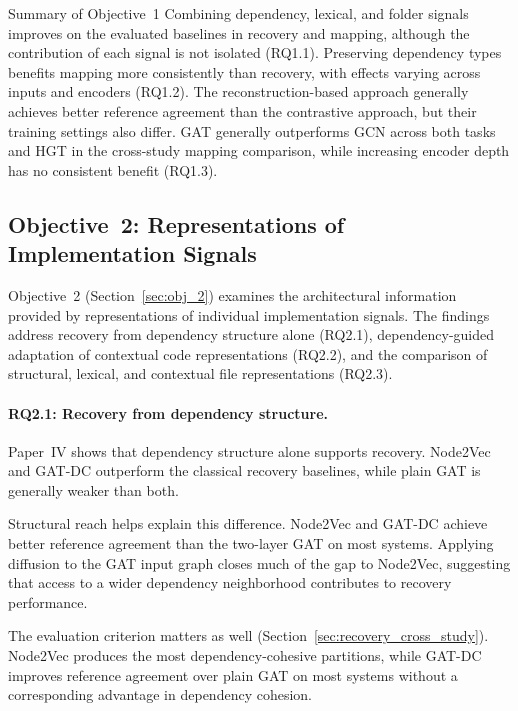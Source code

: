 \begin{GrayBox}{Summary of Objective~1}
Combining dependency, lexical, and folder signals improves on the evaluated baselines in recovery and mapping, although the contribution of each signal is not isolated (RQ1.1). Preserving dependency types benefits mapping more consistently than recovery, with effects varying across inputs and encoders (RQ1.2). The reconstruction-based approach generally achieves better reference agreement than the contrastive approach, but their training settings also differ. GAT generally outperforms GCN across both tasks and HGT in the cross-study mapping comparison, while increasing encoder depth has no consistent benefit (RQ1.3).
\end{GrayBox}

\subsection{Objective~2: Representations of Implementation Signals}\label{sec:cont_2}

Objective~2 (Section~\ref{sec:obj_2}) examines the architectural information provided by representations of individual implementation signals. The findings address recovery from dependency structure alone (RQ2.1), dependency-guided adaptation of contextual code representations (RQ2.2), and the comparison of structural, lexical, and contextual file representations (RQ2.3).

\paragraph{RQ2.1: Recovery from dependency structure.} Paper~IV shows that dependency structure alone supports recovery. Node2Vec and GAT-DC outperform the classical recovery baselines, while plain GAT is generally weaker than both.

Structural reach helps explain this difference. Node2Vec and GAT-DC achieve better reference agreement than the two-layer GAT on most systems. Applying diffusion to the GAT input graph closes much of the gap to Node2Vec, suggesting that access to a wider dependency neighborhood contributes to recovery performance.

The evaluation criterion matters as well (Section~\ref{sec:recovery_cross_study}). Node2Vec produces the most dependency-cohesive partitions, while GAT-DC improves reference agreement over plain GAT on most systems without a corresponding advantage in dependency cohesion.

